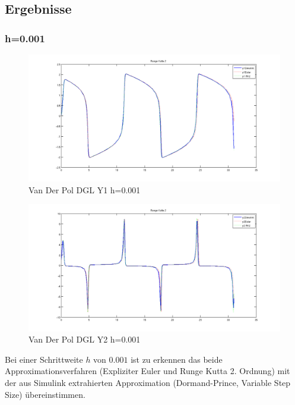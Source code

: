 \documentclass[10pt]{scrartcl}
\begin{document}
	
\subsection{Ergebnisse}
	\subsubsection{h=0.001}
		\begin{figure}[H]
			\centering	
			\includegraphics[width=\textwidth]{vanDerPolY10001.png}
            \caption{Van Der Pol DGL Y1 h=0.001}
            \label{pic:y2vdp0001}
		\end{figure} 
		
		\begin{figure}[H]
			\centering	
			\includegraphics[width=\textwidth]{vanDerPolY20001.png}
            \caption{Van Der Pol DGL Y2 h=0.001}
            \label{pic:y2vdp0001}
		\end{figure}		
		
	Bei einer Schrittweite $h$ von $0.001$ ist zu erkennen das beide Approximationsverfahren (Expliziter Euler und Runge Kutta 2. Ordnung) mit der aus Simulink extrahierten Approximation (Dormand-Prince, Variable Step Size) übereinstimmen.
		
\end{document}
